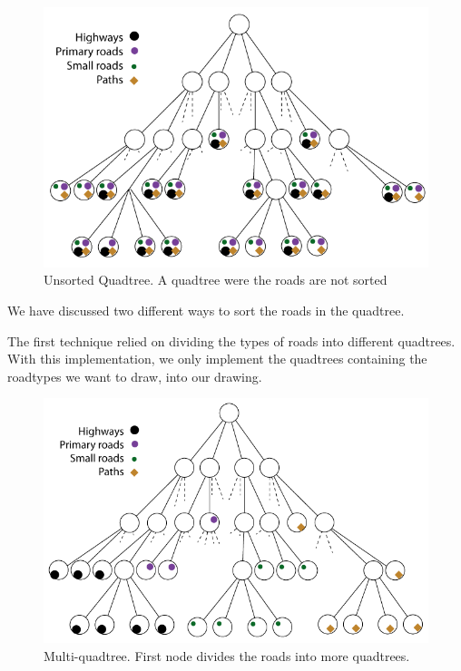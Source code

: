\begin{figure}[h!]
\centering
\includegraphics[width=1\linewidth]{images/UnsortedQuadtree.png}
\caption{Unsorted Quadtree. A quadtree were the roads are not sorted}
\label{IMPL-USQ}
\end{figure}

We have discussed two different ways to sort the roads in the quadtree.

The first technique relied on dividing the types of roads into different quadtrees.
With this implementation, we only implement the quadtrees containing the roadtypes
we want to draw, into our drawing.

\begin{figure}[h!]
\centering
\includegraphics[width=1\linewidth]{images/MultiQuadtree.png}
\caption{Multi-quadtree. First node divides the roads into more
quadtrees.}
\label{IMPL-DCQ}
\end{figure}

